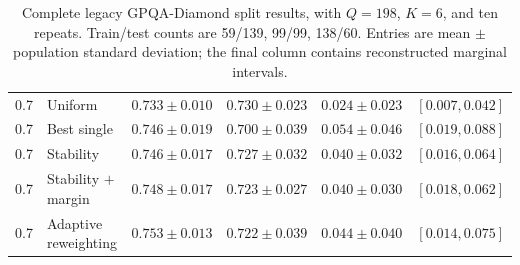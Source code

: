 \begin{table}[p]
\begin{tabular}{clcccc}
0.7 & Uniform & \(0.733\mathbin{\pm}0.010\) & \(0.730\mathbin{\pm}0.023\) & \(0.024\mathbin{\pm}0.023\) & \([0.007,0.042]\) \\
0.7 & Best single & \(0.746\mathbin{\pm}0.019\) & \(0.700\mathbin{\pm}0.039\) & \(0.054\mathbin{\pm}0.046\) & \([0.019,0.088]\) \\
0.7 & Stability & \(0.746\mathbin{\pm}0.017\) & \(0.727\mathbin{\pm}0.032\) & \(0.040\mathbin{\pm}0.032\) & \([0.016,0.064]\) \\
0.7 & Stability \(+\) margin & \(0.748\mathbin{\pm}0.017\) & \(0.723\mathbin{\pm}0.027\) & \(0.040\mathbin{\pm}0.030\) & \([0.018,0.062]\) \\
0.7 & Adaptive reweighting & \(0.753\mathbin{\pm}0.013\) & \(0.722\mathbin{\pm}0.039\) & \(0.044\mathbin{\pm}0.040\) & \([0.014,0.075]\) \\
\bottomrule
\end{tabular}
\caption{Complete legacy GPQA-Diamond split results, with \(Q=198\), \(K=6\), and ten repeats.  Train/test counts are 59/139, 99/99, 138/60.  Entries are mean \(\mathbin{\pm}\) population standard deviation; the final column contains reconstructed marginal intervals.}
\label{tab:legacy-full-gpqa_diamond}
\end{table}


